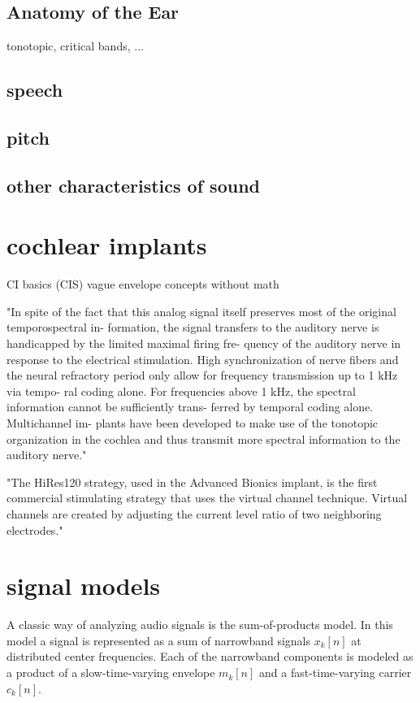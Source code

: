 \documentclass [11pt, proquest] {uwthesis}[2015/03/03]
\begin{document}
\subsection{Anatomy of the Ear}

tonotopic, critical bands, ...

\subsection{speech}

\subsection{pitch}

\subsection{other characteristics of sound}

\section{cochlear implants}
CI basics (CIS)
vague envelope concepts without math

"In spite of the fact that this analog signal itself preserves most of the original temporospectral in- formation, the signal transfers to the auditory nerve is handicapped by the limited maximal firing fre- quency of the auditory nerve in response to the electrical stimulation. High synchronization of nerve fibers and the neural refractory period only allow for frequency transmission up to 1 kHz via tempo- ral coding alone. For frequencies above 1 kHz, the spectral information cannot be sufficiently trans- ferred by temporal coding alone. Multichannel im- plants have been developed to make use of the tonotopic organization in the cochlea and thus transmit more spectral information to the auditory nerve." \cite{somek2006coding}


"The HiRes120 strategy, used in the Advanced Bionics implant, is the first commercial stimulating strategy that uses the virtual channel technique. Virtual channels are created by adjusting the current level ratio of two neighboring electrodes."

\section{signal models}

A classic way of analyzing audio signals is the sum-of-products model.  In this model a signal is represented as a sum of narrowband signals $x_k[n]$ at distributed center frequencies.  Each of the narrowband components is modeled as a product of a slow-time-varying envelope $m_k[n]$ and a fast-time-varying carrier $c_k[n]$.
\end{document}
